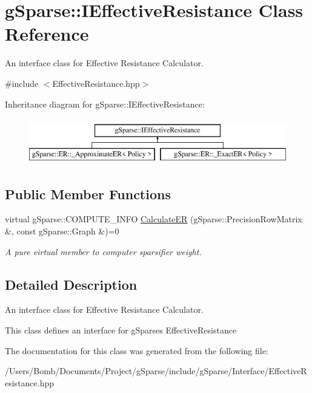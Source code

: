 \hypertarget{classg_sparse_1_1_i_effective_resistance}{}\section{g\+Sparse\+:\+:I\+Effective\+Resistance Class Reference}
\label{classg_sparse_1_1_i_effective_resistance}


An interface class for Effective Resistance Calculator.  




{\ttfamily \#include $<$Effective\+Resistance.\+hpp$>$}

Inheritance diagram for g\+Sparse\+:\+:I\+Effective\+Resistance\+:\begin{figure}[H]
\begin{center}
\leavevmode
\includegraphics[height=2.000000cm]{classg_sparse_1_1_i_effective_resistance}
\end{center}
\end{figure}
\subsection*{Public Member Functions}
\begin{DoxyCompactItemize}
\item 
\mbox{\label{classg_sparse_1_1_i_effective_resistance_aa1f38b056757c2b25a22a6eaa87aa50f}} 
virtual g\+Sparse\+::\+C\+O\+M\+P\+U\+T\+E\+\_\+\+I\+N\+FO \mbox{\hyperlink{classg_sparse_1_1_i_effective_resistance_aa1f38b056757c2b25a22a6eaa87aa50f}{Calculate\+ER}} (g\+Sparse\+::\+Precision\+Row\+Matrix \&, const g\+Sparse\+::\+Graph \&)=0
\begin{DoxyCompactList}\small\item\em A pure virtual member to computer sparsifier weight. \end{DoxyCompactList}\end{DoxyCompactItemize}


\subsection{Detailed Description}
An interface class for Effective Resistance Calculator. 

This class defines an interface for g\+Sparse\textquotesingle{}s Effective\+Resistance 

The documentation for this class was generated from the following file\+:\begin{DoxyCompactItemize}
\item 
/\+Users/\+Bomb/\+Documents/\+Project/g\+Sparse/include/g\+Sparse/\+Interface/Effective\+Resistance.\+hpp\end{DoxyCompactItemize}
